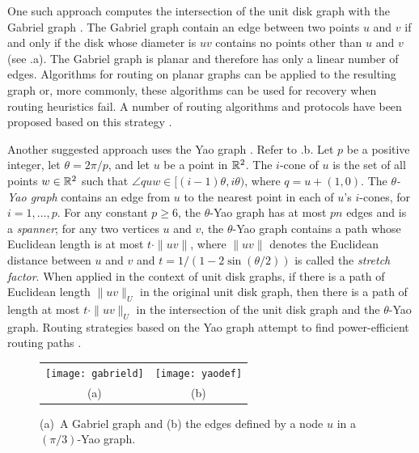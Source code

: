 \documentclass[10pt]{llncs}
\begin{document}
One such approach computes the intersection of the unit disk graph with
the Gabriel graph \cite{gs69}.  The Gabriel graph contain an edge between
two points $u$ and $v$ if and only if the disk whose diameter is $uv$
contains no points other than $u$ and $v$ (see .a).  The
Gabriel graph is planar and therefore has only a linear number of edges.
Algorithms for routing on planar graphs can be applied to the resulting
graph or, more commonly, these algorithms can be used for recovery when
routing heuristics fail.  A number of routing algorithms and protocols
have been proposed based on this strategy \cite{bfno03,bmsu01,kk00}.


Another suggested approach uses the Yao graph \cite{y82}. Refer to
.b. Let $p$ be a positive integer, let $\theta=2\pi/p$,
and let $u$ be a point in $\mathbb{R}^2$.  The $i$-cone of $u$ is the set of all
points $w\in\mathbb{R}^2$ such that $\angle quw \in [(i-1)\theta,i\theta)$, where
$q = u+(1,0)$.  The \emph{$\theta$-Yao graph} contains an edge from $u$
to the nearest point in each of $u$'s $i$-cones, for $i=1,\ldots,p$.
For any constant $p\ge 6$, the $\theta$-Yao graph has at most $pn$
edges and is a \emph{spanner}; for any two vertices $u$ and $v$, the
$\theta$-Yao graph contains a path whose Euclidean length is at most
$t\cdot\|uv\|$, where $\|uv\|$ denotes the Euclidean distance between $u$
and $v$ and $t=1/(1-2\sin(\theta/2))$ is called the \emph{stretch factor}.
When applied in the context of unit disk graphs, if there is a path of
Euclidean length $\|uv\|_U$ in the original unit disk graph, then there
is a path of length at most $t\cdot\|uv\|_U$ in the intersection of
the unit disk graph and the $\theta$-Yao graph.  Routing strategies
based on the Yao graph attempt to find power-efficient routing paths
\cite{glsv02,lwy01,wlbw01,svz07}.

\begin{figure}
  \begin{center}
    \begin{tabular}{cc}
      \texttt{[image: gabrield]} &
      \texttt{[image: yaodef]} \\
      (a) & (b)
    \end{tabular}
  \end{center}
\caption{(a)~A Gabriel graph and (b) the edges defined by a node $u$ in a $(\pi/3)$-Yao graph.}
\end{figure}
\end{document}
